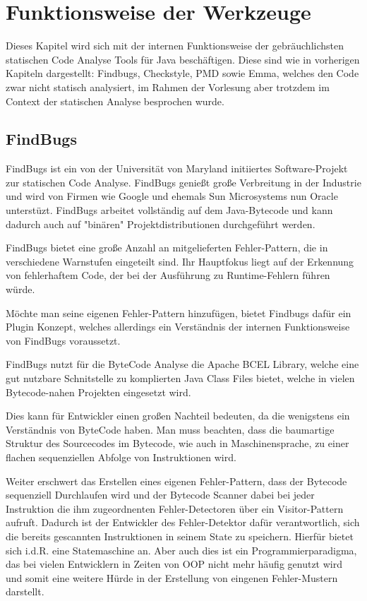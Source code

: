 \section{Funktionsweise der Werkzeuge}

Dieses Kapitel wird sich mit der internen Funktionsweise der gebräuchlichsten statischen Code Analyse Tools für Java beschäftigen. Diese sind wie in vorherigen Kapiteln dargestellt: Findbugs, Checkstyle, PMD sowie Emma, welches den Code zwar nicht statisch analysiert, im Rahmen der Vorlesung aber trotzdem im Context der statischen Analyse besprochen wurde.


\subsection{FindBugs}

FindBugs ist ein von der Universität von Maryland initiiertes Software-Projekt zur statischen Code Analyse. FindBugs genießt große Verbreitung in der Industrie und wird von Firmen wie Google und ehemals Sun Microsystems nun Oracle unterstüzt.
FindBugs arbeitet vollständig auf dem Java-Bytecode und kann dadurch auch auf "binären" Projektdistributionen durchgeführt werden. 

FindBugs bietet eine große Anzahl an mitgelieferten Fehler-Pattern, die in verschiedene Warnstufen eingeteilt sind. Ihr Hauptfokus liegt auf der Erkennung von fehlerhaftem Code, der bei der Ausführung zu Runtime-Fehlern führen würde.

Möchte man seine eigenen Fehler-Pattern hinzufügen, bietet Findbugs dafür ein Plugin Konzept, welches allerdings ein Verständnis der internen Funktionsweise von FindBugs voraussetzt.
 
FindBugs nutzt für die ByteCode Analyse die Apache BCEL Library, welche eine gut nutzbare Schnitstelle zu komplierten Java Class Files bietet, welche in vielen Bytecode-nahen Projekten eingesetzt wird.

Dies kann für Entwickler einen großen Nachteil bedeuten, da die wenigstens ein Verständnis von ByteCode haben. Man muss beachten, dass die baumartige Struktur des Sourcecodes im Bytecode, wie auch in Maschinensprache, zu einer flachen sequenziellen Abfolge von Instruktionen wird. 

Weiter erschwert das Erstellen eines eigenen Fehler-Pattern, dass der Bytecode sequenziell Durchlaufen wird und der Bytecode Scanner dabei bei jeder Instruktion die ihm zugeordnenten Fehler-Detectoren über ein Visitor-Pattern aufruft. 
Dadurch ist der Entwickler des Fehler-Detektor dafür verantwortlich, sich die bereits gescannten Instruktionen in seinem State zu speichern. Hierfür bietet sich i.d.R. eine Statemaschine an. Aber auch dies ist ein Programmierparadigma, das bei vielen Entwicklern in Zeiten von OOP nicht mehr häufig genutzt wird und somit eine weitere Hürde in der Erstellung von eingenen Fehler-Mustern darstellt.

